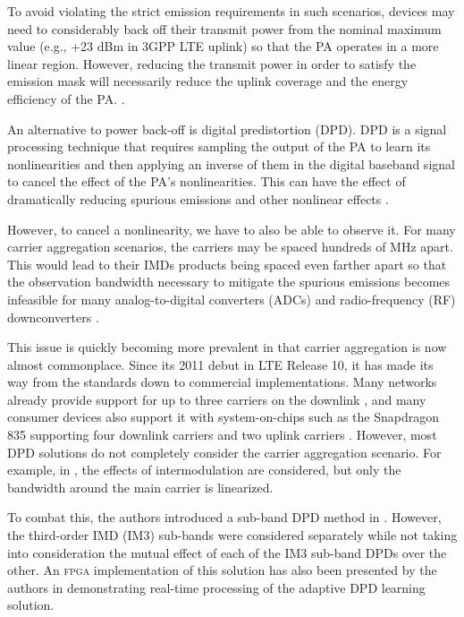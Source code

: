 To avoid violating the strict emission requirements in such scenarios, devices may need to considerably back off their transmit power from the nominal maximum value (e.g., +23 dBm in 3GPP LTE uplink) so that the PA operates in a more linear region. 
However, reducing the transmit power in order to satisfy the emission mask will necessarily reduce the uplink coverage and the energy efficiency of the PA. 
 \cite{P.RoblinJan.2008,J.KimJan.2013,S.A.BassamAug.2012,ICASSP2014,Commag_abdelaziz,Katz16}. 

An alternative to power back-off is digital predistortion (DPD). 
DPD is a signal processing technique that requires sampling the output of the PA to learn its nonlinearities and then applying an inverse of them in the digital baseband signal to cancel the effect of the PA's nonlinearities. 
This can have the effect of dramatically reducing spurious emissions and other nonlinear effects \cite{Katz16}.

However, to cancel a nonlinearity, we have to also be able to observe it. For many carrier aggregation scenarios, the carriers may be spaced hundreds of MHz apart. 
This would lead to their IMDs products being spaced even farther apart so that the observation bandwidth necessary to mitigate the spurious emissions becomes infeasible for many analog-to-digital converters (ADCs) and radio-frequency (RF) downconverters \cite{S.A.BassamOct.2011}. 

This issue is quickly becoming more prevalent in that carrier aggregation is now almost commonplace. Since its 2011 debut in LTE Release 10, it has made its way from the standards down to commercial implementations. Many networks already provide support for up to three carriers on the downlink \cite{AT&T}, and many consumer devices also support it with system-on-chips such as the Snapdragon 835 supporting four downlink carriers and two uplink carriers \cite{Qual835}. 
However, most DPD solutions do not completely consider the carrier aggregation scenario. 
For example, in \cite{S.A.BassamOct.2011}, the effects of intermodulation are considered, but only the bandwidth around the main carrier is linearized. 

To combat this, the authors introduced a sub-band DPD method in \cite{ICASSP2014}. 
However, the third-order IMD (IM3) sub-bands were considered separately while not taking into consideration the mutual effect of each of the IM3 sub-band DPDs over the other. 
An \textsc{fpga} implementation of this solution has also been presented by the authors in \cite{Asilomar2015} demonstrating real-time processing of the adaptive DPD learning solution.

